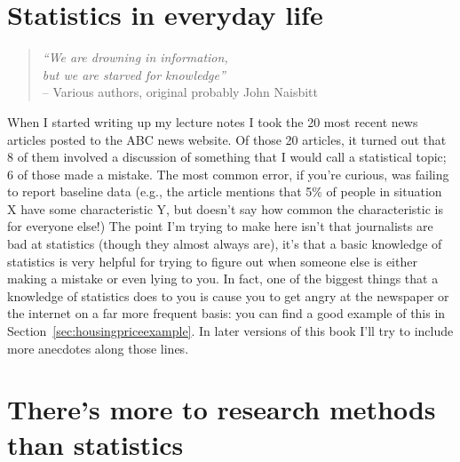 \section{Statistics in everyday life}

\begin{quote}
{\it ``We are drowning in information,\\ but we are starved for knowledge''} \\ \hspace*{2cm} -- Various authors, original probably John Naisbitt
\end{quote}

\noindent
When I started writing up my lecture notes I took the 20 most recent news articles posted to the ABC news website. Of those 20 articles, it turned out that 8 of them involved a discussion of something that I would call a statistical topic; 6 of those made a mistake. The most common error, if you're curious, was failing to report baseline data (e.g., the article mentions that 5\% of people in situation X have some characteristic Y, but doesn't say how common the characteristic is for everyone else!) The point I'm trying to make here isn't that journalists are bad at statistics (though they almost always are), it's that a  basic knowledge of statistics is very helpful for trying to figure out when someone else is either making a mistake or even lying to you. In fact, one of the biggest things that a knowledge of statistics does to you is cause you to get angry at the newspaper or the internet on a far more frequent basis: you can find a good example of this in Section~\ref{sec:housingpriceexample}. In later versions of this book I'll try to include more anecdotes along those lines. 


\section{There's more to research methods than statistics}

